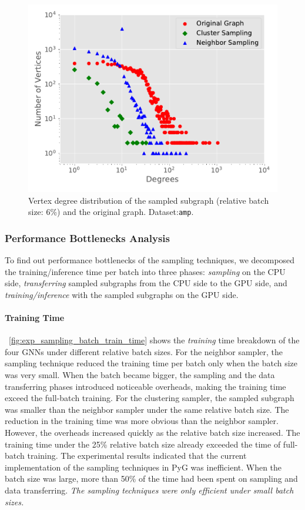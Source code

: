 \begin{figure}[H]
    \centering
    \includegraphics[width=0.4\columnwidth]{figs/experiments/exp_sampling_minibatch_degrees_distribution_amazon-photo.pdf}
    \caption{Vertex degree distribution of the sampled subgraph (relative batch size: 6\%) and the original graph. Dataset:\texttt{amp}.}
    \label{fig:exp_sampling_minibatch_degrees_distribution}
\end{figure}

\subsubsection{Performance Bottlenecks Analysis}

To find out performance bottlenecks of the sampling techniques, we decomposed the training/inference time per batch into three phases: \emph{sampling} on the CPU side, \emph{transferring} sampled subgraphs from the CPU side to the GPU side, and \emph{training/inference} with the sampled subgraphs on the GPU side.

\paragraph{Training Time}

\figurename~\ref{fig:exp_sampling_batch_train_time} shows the \emph{training} time breakdown of the four GNNs under different relative batch sizes.
%
For the neighbor sampler, the sampling technique reduced the training time per batch only when the batch size was very small.
%
When the batch became bigger, the sampling and the data transferring phases introduced noticeable overheads, making the training time exceed the full-batch training.
%
For the clustering sampler, the sampled subgraph was smaller than the neighbor sampler under the same relative batch size.
%
The reduction in the training time was more obvious than the neighbor sampler.
%
However, the overheads increased quickly as the relative batch size increased.
%
The training time under the 25\% relative batch size already exceeded the time of full-batch training.
%
The experimental results indicated that the current implementation of the sampling techniques in PyG was inefficient.
%
When the batch size was large, more than 50\% of the time had been spent on sampling and data transferring.
%
\emph{The sampling techniques were only efficient under small batch sizes.}


